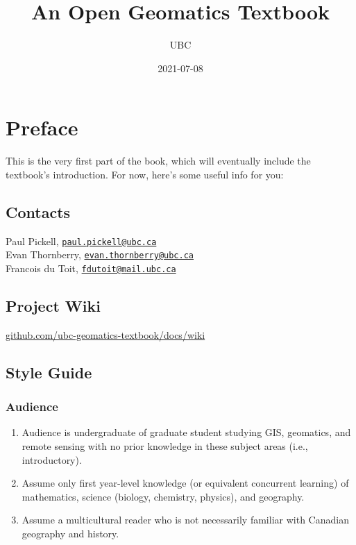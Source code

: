 \documentclass[
]{book}
\title{An Open Geomatics Textbook}
\author{UBC}
\date{2021-07-08}
\providecommand{\tightlist}{%
  \setlength{\itemsep}{0pt}\setlength{\parskip}{0pt}}
\begin{document}
\maketitle

{
\setcounter{tocdepth}{1}
\tableofcontents
}
\hypertarget{preface}{%
\chapter*{Preface}\label{preface}}

This is the very first part of the book, which will eventually include the textbook's introduction. For now, here's some useful info for you:

\hypertarget{contacts}{%
\section{Contacts}\label{contacts}}

Paul Pickell, \href{mailto:paul.pickell@ubc.ca}{\nolinkurl{paul.pickell@ubc.ca}}\\
Evan Thornberry, \href{mailto:evan.thornberry@ubc.ca}{\nolinkurl{evan.thornberry@ubc.ca}}\\
Francois du Toit, \href{mailto:fdutoit@mail.ubc.ca}{\nolinkurl{fdutoit@mail.ubc.ca}}

\hypertarget{project-wiki}{%
\section{Project Wiki}\label{project-wiki}}

\href{https://github.com/ubc-geomatics-textbook/docs/wiki}{github.com/ubc-geomatics-textbook/docs/wiki}

\hypertarget{style-guide}{%
\section{Style Guide}\label{style-guide}}

\hypertarget{audience}{%
\subsection{Audience}\label{audience}}

\begin{enumerate}
\def\labelenumi{\arabic{enumi}.}
\tightlist
\item
  Audience is undergraduate of graduate student studying GIS, geomatics, and remote sensing with no prior knowledge in these subject areas (i.e., introductory).
\item
  Assume only first year-level knowledge (or equivalent concurrent learning) of mathematics, science (biology, chemistry, physics), and geography.
\item
  Assume a multicultural reader who is not necessarily familiar with Canadian geography and history.
\end{enumerate}
\end{document}
